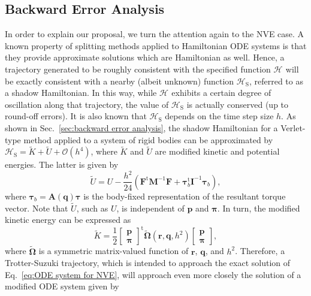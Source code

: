 \documentclass[
journal=jctcce,
layout=twocolumn
]{achemso}
\newcommand{\mt}[1]{\boldsymbol{\mathbf{#1}}}   %
\newcommand{\vt}[1]{\boldsymbol{\mathbf{#1}}}   %
\newcommand{\tr}[1]{#1^\text{t}}                %
\newcommand{\Ham}[1]{{\mathcal H}_\text{#1}}    %
\newcommand{\timestep}{h}
\newcommand{\modified}[1]{\widetilde{#1}}
\begin{document}
\subsection{Backward Error Analysis}

In order to explain our proposal, we turn the attention again to the NVE case.
A known property of splitting methods applied to Hamiltonian ODE systems is that they provide approximate solutions which are Hamiltonian as well.
Hence, a trajectory generated to be roughly consistent with the specified function $\Ham{}$ will be exactly consistent with a nearby (albeit unknown) function $\Ham{S}$, referred to as a shadow Hamiltonian.
In this way, while $\Ham{}$ exhibits a certain degree of oscillation along that trajectory, the value of $\Ham{S}$ is actually conserved (up to round-off errors).
It is also known that $\Ham{S}$ depends on the time step size $\timestep$.
As shown in Sec.~\ref{sec:backward error analysis}, the shadow Hamiltonian for a Verlet-type method applied to a system of rigid bodies can be approximated by $\Ham{S} = \modified K + \modified U + \mathcal{O}(h^4)$, where $\modified K$ and $\modified U$ are modified kinetic and potential energies.
The latter is given by
\begin{equation}
\label{eq:modified potential energy}
\modified U = U - \frac{\timestep^2}{24} \left( \tr{\vt F} {\mt M}^{-1} {\vt F} + \tr{\vt \tau}_b {\mt I}^{-1} {\vt \tau}_b \right),
\end{equation}
where ${\vt \tau}_b = {\mt A}(\vt q) {\vt \tau}$ is the body-fixed representation of the resultant torque vector.
Note that $\modified U$, such as $U$, is independent of $\vt p$ and $\vt \pi$.
In turn, the modified kinetic energy can be expressed as
\begin{equation}
\label{eq:modified kinetic energy}
\modified K = \frac{1}{2} \tr{ \left[\begin{array}{c} \vt p \\ \vt \pi \end{array}\right]} \modified{\mathbf \Omega}(\vt r, \vt q, \timestep^2) \left[\begin{array}{c} \vt p \\ \vt \pi \end{array}\right],
\end{equation}
where $\modified{\mathbf \Omega}$ is a symmetric matrix-valued function of $\vt r$, $\vt q$, and $\timestep^2$.
Therefore, a Trotter-Suzuki trajectory, which is intended to approach the exact solution of Eq.~\eqref{eq:ODE system for NVE}, will approach even more closely the solution of a modified ODE system given by
\end{document}
